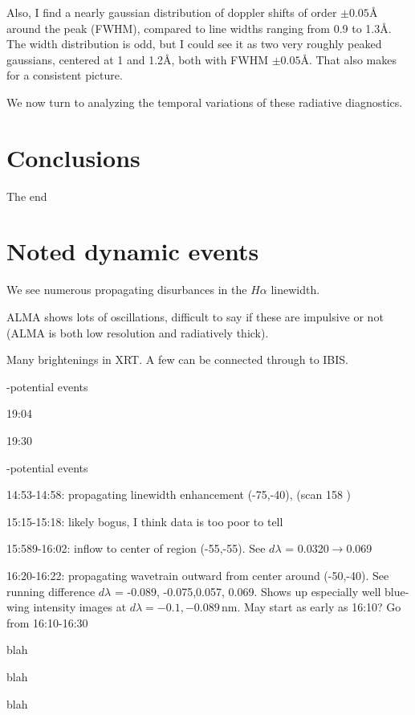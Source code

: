 \documentclass[twocolumn]{aastex62}
\newcommand{\unit}[1]{\ensuremath{\, \mathrm{#1}}}
\newcommand{\halpha}{\ensuremath{H\alpha}}
\begin{document}
Also, I find a nearly gaussian distribution of doppler shifts of order $\pm0.05$\AA{} around the peak (FWHM), compared to line widths ranging from 0.9 to 1.3\AA{}.  The width distribution is odd, but I could see it as two very roughly peaked gaussians, centered at 1 and 1.2\AA{}, both with FWHM $\pm0.05$\AA{}.  That also makes for a consistent picture.

We now turn to analyzing the temporal variations of these radiative diagnostics.

\section{Conclusions}\label{sec:conclusion}
The end

\section{Noted dynamic events}
We see numerous propagating disurbances in the \halpha{} linewidth.

ALMA shows lots of oscillations, difficult to say if these are impulsive or not (ALMA is both low resolution and radiatively thick). 

Many brightenings in XRT. A few can be connected through to IBIS.
\begin{description}
    {\item[NuSTAR]-potential events}
    \begin{itemize}
        {\item 19:04}
        {\item 19:30}
    \end{itemize}
    {\item[IBIS]-potential events}
        \begin{itemize}
            {\item 14:53-14:58: propagating linewidth enhancement (-75,-40), (scan 158 )}
            {\item 15:15-15:18: likely bogus, I think data is too poor to tell}
            {\item 15:589-16:02: inflow to center of region (-55,-55).  See $d\lambda$ = 0.0320$\rightarrow$0.069}
            {\item 16:20-16:22: propagating wavetrain outward from center around (-50,-40).  See running difference $d\lambda$ = -0.089, -0.075,0.057, 0.069.  Shows up especially well blue-wing intensity images at $d\lambda = -0.1, -0.089\unit{nm}$.  May start as early as 16:10?  Go from 16:10-16:30}
        \end{itemize}
    {\item[XRT] blah}
    {\item[ALMA] blah}
    {\item[IRIS] blah}
\end{description}
\end{document}
